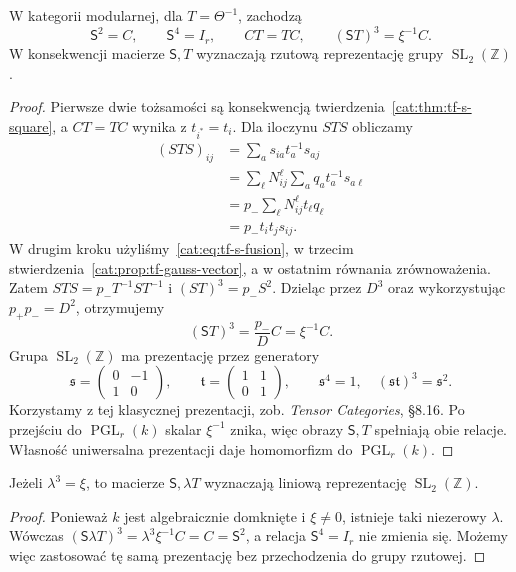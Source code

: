 \begin{twierdzenie}\label{cat:thm:tf-modular-relations}
W kategorii modularnej, dla $T=\Theta^{-1}$, zachodzą
\[
 \mathsf S^2=C,\qquad \mathsf S^4=I_r,\qquad CT=TC,
 \qquad (\mathsf ST)^3=\xi^{-1}C.
\]
W konsekwencji macierze $\mathsf S,T$ wyznaczają rzutową reprezentację grupy $\operatorname{SL}_2(\mathbb Z)$.
\end{twierdzenie}
\begin{proof}
Pierwsze dwie tożsamości są konsekwencją twierdzenia~\ref{cat:thm:tf-s-square}, a $CT=TC$ wynika z $t_{i^*}=t_i$. Dla iloczynu $STS$ obliczamy
\[
\begin{aligned}
 (STS)_{ij}
 &=\sum_a s_{ia}t_a^{-1}s_{aj}\\
 &=\sum_\ell N_{ij}^{\ell}\sum_a q_a t_a^{-1}s_{a\ell}\\
 &=p_-\sum_\ell N_{ij}^{\ell}t_\ell q_\ell\\
 &=p_-t_it_js_{ij}.
\end{aligned}
\]
W drugim kroku użyliśmy~\eqref{cat:eq:tf-s-fusion}, w trzecim stwierdzenia~\ref{cat:prop:tf-gauss-vector}, a w ostatnim równania zrównoważenia. Zatem $STS=p_-T^{-1}ST^{-1}$ i $(ST)^3=p_-S^2$. Dzieląc przez $D^3$ oraz wykorzystując $p_+p_-=D^2$, otrzymujemy
\[
 (\mathsf ST)^3=\frac{p_-}{D}C=\xi^{-1}C.
\]
Grupa $\operatorname{SL}_2(\mathbb Z)$ ma prezentację przez generatory
\[
 \mathfrak s=\begin{pmatrix}0&-1\\1&0\end{pmatrix},
 \qquad
 \mathfrak t=\begin{pmatrix}1&1\\0&1\end{pmatrix},
 \qquad
 \mathfrak s^4=1,\quad(\mathfrak s\mathfrak t)^3=\mathfrak s^2.
\]
Korzystamy z tej klasycznej prezentacji, zob. \emph{Tensor Categories}, \S8.16. Po przejściu do $\operatorname{PGL}_r(k)$ skalar $\xi^{-1}$ znika, więc obrazy $\mathsf S,T$ spełniają obie relacje. Własność uniwersalna prezentacji daje homomorfizm do $\operatorname{PGL}_r(k)$.
\end{proof}

\begin{wniosek}\label{cat:cor:tf-modular-linear}
Jeżeli $\lambda^3=\xi$, to macierze $\mathsf S,\lambda T$ wyznaczają liniową reprezentację $\operatorname{SL}_2(\mathbb Z)$.
\end{wniosek}
\begin{proof}
Ponieważ $k$ jest algebraicznie domknięte i $\xi\neq0$, istnieje taki niezerowy $\lambda$. Wówczas $(\mathsf S\lambda T)^3=\lambda^3\xi^{-1}C=C=\mathsf S^2$, a relacja $\mathsf S^4=I_r$ nie zmienia się. Możemy więc zastosować tę samą prezentację bez przechodzenia do grupy rzutowej.
\end{proof}

